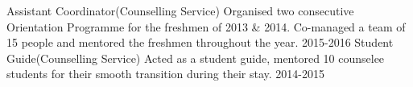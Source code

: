 \begin{cvhonors}
  \cvhonor
    {Assistant Coordinator(Counselling Service)}
    {Organised two consecutive Orientation Programme for the freshmen of 2013 \& 2014. Co-managed a team of 15 people and mentored the freshmen throughout the year.}
    {}
    {2015-2016}
  \cvhonor
    {Student Guide(Counselling Service)}
    {Acted as a student guide, mentored 10 counselee students  for their smooth transition during their stay.}
    {}
    {2014-2015}
\end{cvhonors}
